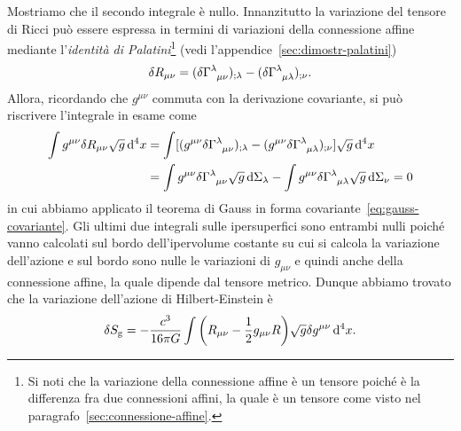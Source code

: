 Mostriamo che il secondo integrale è nullo.  Innanzitutto la
variazione del tensore di Ricci può
essere espressa in termini di variazioni della connessione affine mediante
l'\emph{identità di
  Palatini}\footnote{Si
  noti che la variazione della connessione affine è un tensore poiché è la
  differenza fra due connessioni affini, la quale è un tensore come visto nel
  paragrafo~\ref{sec:connessione-affine}.}
(vedi l'appendice~\ref{sec:dimostr-palatini})
\begin{equation}
  \delta R_{\mu\nu} = (\delta \tensor{\Gamma}{^{\lambda}_{\mu\nu}})_{;\lambda} -
  (\delta \tensor{\Gamma}{^{\lambda}_{\mu\lambda}})_{;\nu}.
\end{equation}
Allora, ricordando che $g^{\mu\nu}$ commuta con la derivazione covariante, si
può riscrivere l'integrale in esame come
\begin{equation}
  \begin{split}
    \int g^{\mu\nu} \delta R_{\mu\nu} \sqrt{g} \dd^{4} x &= \int [ ( g^{\mu\nu}
    \delta \tensor{\Gamma}{^{\lambda}_{\mu\nu}} )_{;\lambda} - ( g^{\mu\nu} \delta
    \tensor{\Gamma}{^{\lambda}_{\mu\lambda}})_{;\nu} ] \sqrt{g} \dd^{4} x \\
    &= \int g^{\mu\nu} \delta \tensor{\Gamma}{^{\lambda}_{\mu\nu}} \sqrt{g} \dd
    \Sigma_{\lambda} - \int g^{\mu\nu}
    \delta\tensor{\Gamma}{^{\lambda}_{\mu\lambda}} \sqrt{g}\dd\Sigma_{\nu} = 0
  \end{split}
\end{equation}
in cui abbiamo applicato il teorema di Gauss in forma
covariante~\eqref{eq:gauss-covariante}.  Gli ultimi due integrali sulle
ipersuperfici sono entrambi nulli poiché vanno calcolati sul bordo
dell'ipervolume costante su cui si calcola la variazione dell'azione e sul bordo
sono nulle le variazioni di $g_{\mu\nu}$ e quindi anche della connessione
affine, la quale dipende dal tensore metrico.  Dunque abbiamo trovato che la
variazione dell'azione di Hilbert-Einstein è
\begin{equation}
  \delta S_{\textup{g}} = -\frac{c^{3}}{16\pi G} \int \bigg( R_{\mu\nu} -
  \frac{1}{2} g_{\mu\nu} R \bigg)\sqrt{g} \delta g^{\mu\nu} \mathop{}\!\mathrm{d}^{4} x.
\end{equation}


